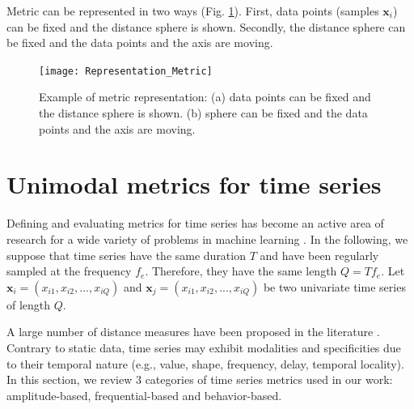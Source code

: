 Metric can be represented in two ways (Fig. \ref{fig:Representation_Metric}). First, data points (samples $\textbf{x}_i$) can be fixed and the distance sphere is shown. Secondly, the distance sphere can be fixed and the data points and the axis are moving.
\begin{figure}[h!]
	\centering
	\texttt{[image: Representation\_Metric]}
	\caption{Example of metric representation: (a) data points can be fixed and the distance sphere is shown. (b) sphere can be fixed and the data points and the axis are moving.}
	\label{fig:Representation_Metric}
\end{figure}



\section{Unimodal metrics for time series}
\label{sec:metric_time_series}
Defining and evaluating metrics for time series has become an active area of research for a wide variety of problems in machine learning \cite{Ding2008, Najmeddine2012}. In the following, we suppose that time series have the same duration $T$ and have been regularly sampled at the frequency $f_e$. Therefore, they have the same length $Q=Tf_e$. Let $\textbf{x}_i=(x_{i1}, x_{i2}, ..., x_{iQ})$ and $\textbf{x}_j=(x_{i1}, x_{i2}, ..., x_{iQ})$ be two univariate time series of length $Q$. 

A large number of distance measures have been proposed in the literature \cite{Montero2014}. Contrary to static data, time series may exhibit modalities and specificities due to their temporal nature (e.g., value, shape, frequency, delay, temporal locality). In this section, we review 3 categories of time series metrics used in our work: amplitude-based, frequential-based and behavior-based.



%




